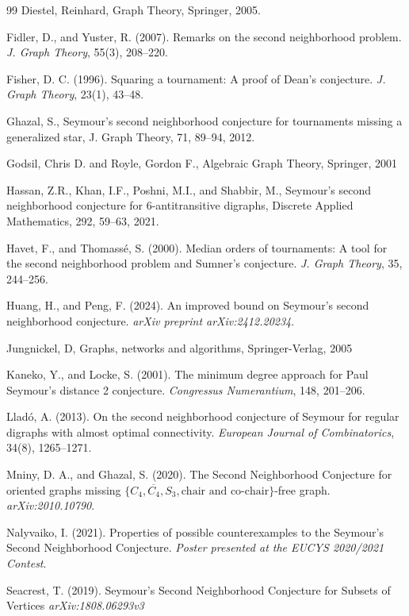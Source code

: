\documentclass[AMS, Times1COL]{article} %
\theoremstyle{definition}
\begin{document}
\begin{thebibliography}{99}
		 Diestel, Reinhard, Graph Theory, Springer, 2005.
		
		 Fidler, D., and Yuster, R. (2007). Remarks on the second neighborhood problem. \textit{J. Graph Theory}, 55(3), 208--220.
		
		 Fisher, D. C. (1996). Squaring a tournament: A proof of Dean's conjecture. \textit{J. Graph Theory}, 23(1), 43--48.
		
		 Ghazal, S., Seymour's second neighborhood conjecture for tournaments missing a generalized star, J. Graph Theory, 71, 89--94, 2012.
		
		 Godsil, Chris D. and Royle, Gordon F., Algebraic Graph Theory, Springer, 2001
		
		 Hassan, Z.R., Khan, I.F., Poshni, M.I., and Shabbir, M., Seymour's second neighborhood conjecture for 6-antitransitive digraphs, Discrete Applied Mathematics, 292, 59--63, 2021.
		
		 Havet, F., and Thomassé, S. (2000). Median orders of tournaments: A tool for the second neighborhood problem and Sumner's conjecture. \textit{J. Graph Theory}, 35, 244--256.
		
		 Huang, H., and Peng, F. (2024). An improved bound on Seymour's second neighborhood conjecture. \textit{arXiv preprint arXiv:2412.20234}.
		
		 Jungnickel, D, Graphs, networks and algorithms, Springer-Verlag, 2005
		
		 Kaneko, Y., and Locke, S. (2001). The minimum degree approach for Paul Seymour's distance 2 conjecture. \textit{Congressus Numerantium}, 148, 201--206.
		
		 Lladó, A. (2013). On the second neighborhood conjecture of Seymour for regular digraphs with almost optimal connectivity. \textit{European Journal of Combinatorics}, 34(8), 1265--1271.
		
		 Mniny, D. A., and Ghazal, S. (2020). The Second Neighborhood Conjecture for oriented graphs missing $\{C_{4}, \overline{C_{4}}, S_{3}, \text{chair and co-chair}\}$-free graph. \textit{arXiv:2010.10790}.
		
		 Nalyvaiko, I. (2021). Properties of possible counterexamples to the Seymour's Second Neighborhood Conjecture. \textit{Poster presented at the EUCYS 2020/2021 Contest}.
		
		 Seacrest, T. (2019). Seymour's Second Neighborhood Conjecture for Subsets of Vertices \textit{arXiv:1808.06293v3}
	\end{thebibliography}
	
\end{document}
